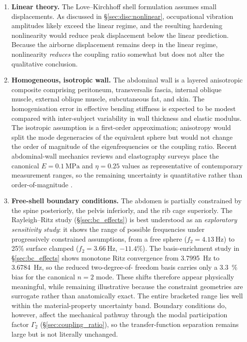 \begin{enumerate}

  \item \textbf{Linear theory.}  The Love--Kirchhoff shell formulation
    assumes small displacements.  As discussed in
    \S\ref{sec:disc:nonlinear}, occupational vibration amplitudes likely
    exceed the linear regime, and the resulting hardening nonlinearity would
    reduce peak displacement below the linear prediction.  Because the airborne
    displacement remains deep in the linear regime, nonlinearity
    \emph{reduces} the coupling ratio somewhat but does not alter the
    qualitative conclusion.

  \item \textbf{Homogeneous, isotropic wall.}  The abdominal wall is a
    layered anisotropic composite comprising peritoneum, transversalis
    fascia, internal oblique muscle, external oblique muscle, subcutaneous
    fat, and skin.  The homogenisation error in effective bending stiffness
    is expected to be modest compared with inter-subject variability in
    wall thickness and elastic modulus.  The isotropic assumption is a
    first-order approximation; anisotropy would split the mode degeneracies
    of the equivalent sphere but would not change the order of magnitude of
    the eigenfrequencies or the coupling ratio.  Recent abdominal-wall
    mechanics reviews and elastography surveys place the canonical
    $E = \SI{0.1}{\mega\pascal}$ and $\eta = 0.25$ values as representative of
    contemporary measurement ranges, so the remaining uncertainty is
    quantitative rather than order-of-magnitude \cite{Deeken2017,Sack2023}.

  \item \textbf{Free-shell boundary conditions.}  The abdomen is partially
    constrained by the spine posteriorly, the pelvis inferiorly, and the
    rib cage superiorly.  The Rayleigh--Ritz study
    (\S\ref{sec:bc_effects}) is best understood as an \emph{exploratory
    sensitivity study}: it shows the range of possible frequencies under
    progressively constrained assumptions, from a free sphere
    ($f_2 = \SI{4.13}{\hertz}$) to 25\% surface clamped
    ($f_2 = \SI{3.66}{\hertz}$, $-11.4\%$).  The basis-enrichment study in
    \S\ref{sec:bc_effects} shows monotone Ritz convergence from
    \SI{3.7995}{\hertz} to \SI{3.6784}{\hertz}, so the reduced two-degree-of-
    freedom basis carries only a \SI{3.3}{\percent} bias for the canonical
    $n=2$ mode.  These shifts therefore appear physically meaningful, while
    remaining illustrative because the constraint geometries are surrogate
    rather than anatomically exact.  The entire bracketed range lies well
    within the material-property uncertainty band.  Boundary
    conditions do, however, affect the mechanical pathway through the modal
    participation factor $\Gamma_2$ (\S\ref{sec:coupling_ratio}), so the
    transfer-function separation remains large but is not literally unchanged.


\end{enumerate}
